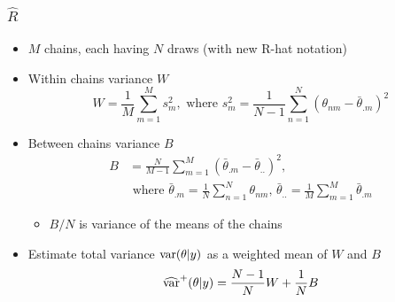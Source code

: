 \documentclass[10pt,handout]{beamer}
\begin{document}
\begin{frame}[fragile]
\begin{itemize}
  \end{itemize}

\end{frame}

\begin{frame}

\frametitle{ $\widehat{R}$}

  \begin{itemize}
  \item $M$ chains, each having $N$ draws (with new R-hat notation)
  \item<2-> Within chains variance $W$
    \begin{equation*}
      W=\frac{1}{M}\sum_{m=1}^M s^2_m ,\text{ where }
      s^2_m=\frac{1}{N-1}\sum_{n=1}^N (\theta_{nm}-\bar{\theta}_{.m})^2
    \end{equation*}
  \item<3-> Between chains variance $B$
    \begin{align*}
      B&=\frac{N}{M-1}\sum_{m=1}^M
      (\bar{\theta}_{.m}-\bar{\theta}_{..})^2,\\
      &\text{ where } \bar{\theta}_{.m}=\frac{1}{N}\sum_{n=1}^N \theta_{nm}, \,
      \bar{\theta}_{..}=\frac{1}{M}\sum_{m=1}^M\bar{\theta}_{.m}
    \end{align*}
    \begin{itemize}
      \item<4-> $B/N$ is variance of the means of the chains
    \end{itemize}
    \vspace{2mm}
  \item<5-> Estimate total variance
    $\mathrm{var}(\theta|y)$ as a weighted mean of $W$ and $B$
    \begin{equation*}
      \widehat{\mathrm{var}}^{+}(\theta|y) = \frac{N-1}{N}W+\frac{1}{N}B
    \end{equation*}
  \end{itemize}

\end{frame}
\end{document}
